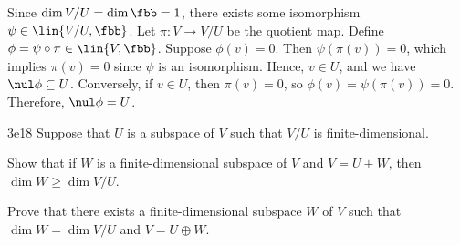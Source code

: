 \begin{sol}
    Since $\dim V / U = \dim \fbb = 1$, there exists some isomorphism $\psi \in \lin{V /U, \fbb}$.
	Let $\pi: V \to V / U$ be the quotient map.
	Define $\phi = \psi \circ \pi \in \lin{V, \fbb}$.
	Suppose $\phi(v) = 0$.
	Then $\psi(\pi(v)) = 0$, which implies $\pi(v) = 0$ since $\psi$ is an isomorphism.
	Hence, $v \in U$, and we have $\nul \phi \subseteq U$.
	Conversely, if $v \in U$, then $\pi(v) = 0$, so $\phi(v) = \psi(\pi(v)) = 0$.
	Therefore, $\nul \phi = U$.
\end{sol}

\begin{exercise}{3e18}
    Suppose that $U$ is a subspace of $V$ such that $V / U$ is finite-dimensional.
    \begin{subexercises}
        \item Show that if $W$ is a finite-dimensional subspace of $V$ and $V = U + W$, then $\dim W \geq \dim V / U$.
        \item Prove that there exists a finite-dimensional subspace $W$ of $V$ such that $\dim W = \dim V / U$ and $V = U \oplus W$.
    \end{subexercises}
\end{exercise}

